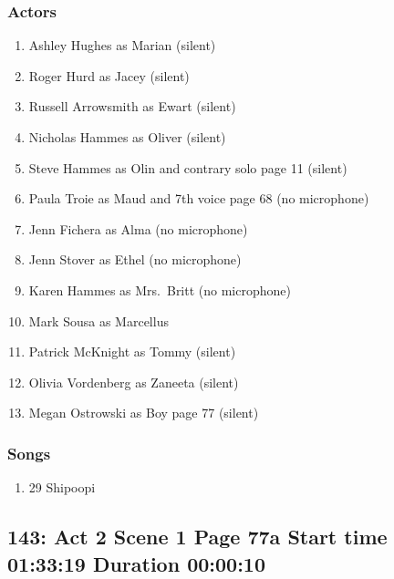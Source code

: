 \subsubsection{Actors}
\begin{enumerate}
\item Ashley Hughes as Marian (silent)
\item Roger Hurd as Jacey (silent)
\item Russell Arrowsmith as Ewart (silent)
\item Nicholas Hammes as Oliver (silent)
\item Steve Hammes as Olin and contrary solo page 11 (silent)
\item Paula Troie as Maud and 7th voice page 68 (no microphone)
\item Jenn Fichera as Alma (no microphone)
\item Jenn Stover as Ethel (no microphone)
\item Karen Hammes as Mrs.~Britt (no microphone)
\item Mark Sousa as Marcellus
\item Patrick McKnight as Tommy (silent)
\item Olivia Vordenberg as Zaneeta (silent)
\item Megan Ostrowski as Boy page 77 (silent)
\end{enumerate}

\subsubsection{Songs}
\begin{enumerate}
\item 29 Shipoopi
\end{enumerate}
\subsection{143: Act 2 Scene 1 Page 77a Start time 01:33:19 Duration 00:00:10}

